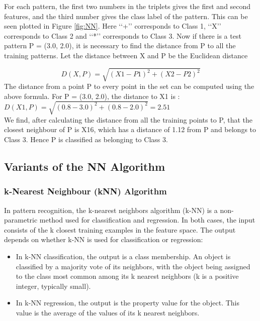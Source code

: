 For each pattern, the first two numbers in the triplets gives the first and second
features, and the third number gives the class label of the pattern.
This can be seen plotted in Figure \ref{fig:NN}. Here ‘‘+’’ corresponds to Class 1, ‘‘X’’
corresponds to Class 2 and ‘‘*’’ corresponds to Class 3.
Now if there is a test pattern P = (3.0, 2.0), it is necessary to find the distance
from P to all the training patterns.
Let the distance between X and P be the Euclidean distance

$$D(X,P) = \sqrt{(X1 - P1)^{2} + (X2 - P2 )^{2} }$$
\newline
The distance from a point P to every point in the set can be computed using the above formula. For P = (3.0, 2.0), the distance to X1 is :
$D(X1,P) = \sqrt{(0.8 - 3.0)^{2} + (0.8 - 2.0 )^{2} } = 2.51 $ \\
We find, after calculating the distance from all the training points to P, that the closest
neighbour of P is X16, which has a distance of 1.12 from P and belongs to Class 3.
Hence P is classified as belonging to Class 3.
\subsection{Variants of the NN Algorithm}
\subsubsection{k-Nearest Neighbour (kNN) Algorithm}
In pattern recognition, the k-nearest neighbors algorithm (k-NN) is a non-parametric method used for classification and regression.  In both cases, the input consists of the k closest training examples in the feature space. The output depends on whether k-NN is used for classification or regression:
\begin{itemize}
\item In k-NN classification, the output is a class membership. An object is classified by a majority vote of its neighbors, with the object being assigned to the class most common among its k nearest neighbors (k is a positive integer, typically small). 
\item In k-NN regression, the output is the property value for the object. This value is the average of the values of its k nearest neighbors.
\end{itemize}

